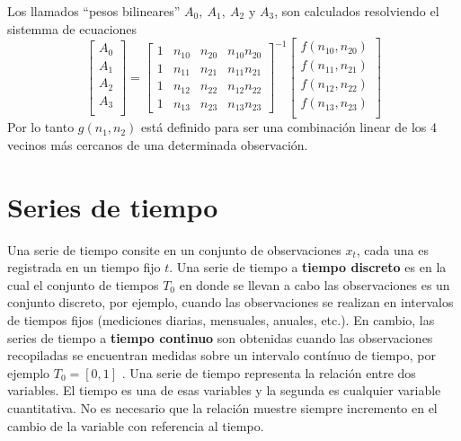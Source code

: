 Los llamados ``pesos bilineares''\cite{26} $A_0,~A_1,~A_2\text{ y }A_3$, son calculados resolviendo el sistemma de ecuaciones
\begin{equation}\label{interp2d}
    \begin{bmatrix}
        A_0 \\
        A_1 \\
        A_2 \\
        A_3 \\
    \end{bmatrix}
    =
    \begin{bmatrix}
        1 & n_{10} & n_{20} & n_{10}n_{20} \\
        1 & n_{11} & n_{21} & n_{11}n_{21} \\
        1 & n_{12} & n_{22} & n_{12}n_{22} \\
        1 & n_{13} & n_{23} & n_{13}n_{23} 
    \end{bmatrix}^{-1}
    \begin{bmatrix}
        f(n_{10},n_{20}) \\
        f(n_{11},n_{21}) \\
        f(n_{12},n_{22}) \\
        f(n_{13},n_{23}) \\
    \end{bmatrix}
\end{equation}
Por lo tanto $g(n_1,n_2)$ está definido para ser una combinación linear de los 4 vecinos más cercanos de una determinada observación.
%
%
%
%
\section{Series de tiempo}
Una serie de tiempo consite en un conjunto de observaciones $x_t$, cada una es registrada en un tiempo fijo $t$.
Una serie de tiempo a \textbf{tiempo discreto} es en la cual el conjunto de tiempos $T_0$ en donde se llevan a cabo las observaciones
es un conjunto discreto, por ejemplo, cuando las observaciones se realizan en intervalos de tiempos fijos (mediciones diarias, mensuales, anuales, etc.). 
En cambio, las series de tiempo a \textbf{tiempo continuo } son obtenidas cuando las observaciones recopiladas se encuentran medidas sobre un intervalo
contínuo de tiempo, por ejemplo $T_0=[0,1]$ \cite{21}. Una serie de tiempo representa la relación entre dos variables. El tiempo es una de esas variables 
y la segunda es cualquier variable cuantitativa. No es necesario que la relación muestre siempre incremento en el cambio de la variable con referencia al tiempo. 

